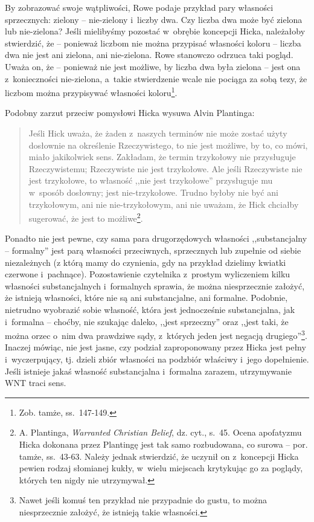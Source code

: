 By zobrazować swoje wątpliwości, Rowe podaje przykład pary własności sprzecznych: zielony -- nie-zielony i~liczby dwa. Czy liczba dwa może być zielona lub nie-zielona? Jeśli mielibyśmy pozostać w~obrębie koncepcji Hicka, należałoby stwierdzić, że -- ponieważ liczbom nie można przypisać własności koloru -- liczba dwa nie jest ani zielona, ani nie-zielona. Rowe stanowczo odrzuca taki pogląd. Uważa on, że -- ponieważ nie jest możliwe, by liczba dwa była zielona -- jest ona z~konieczności nie-zielona, a~takie stwierdzenie wcale nie pociąga za sobą tezy, że liczbom można przypisywać własności koloru\footnote{Zob. tamże, ss.~147-149.}.

Podobny zarzut przeciw pomysłowi Hicka wysuwa Alvin Plantinga:

\begin{quote}
Jeśli Hick uważa, że żaden z~naszych terminów nie może zostać użyty dosłownie na określenie Rzeczywistego, to nie jest możliwe, by to, co mówi, miało jakikolwiek sens. Zakładam, że termin trzykołowy nie przysługuje Rzeczywistemu; Rzeczywiste nie jest trzykołowe. Ale jeśli Rzeczywiste nie jest trzykołowe, to własność ,,nie jest trzykołowe'' przysługuje mu w~sposób dosłowny; jest nie-trzykołowe. Trudno byłoby nie być ani trzykołowym, ani nie nie-trzykołowym, ani nie uważam, że Hick chciałby sugerować, że jest to możliwe\footnote{A. Plantinga, \textit{Warranted Christian Belief}, dz. cyt., s.~45. Ocena apofatyzmu Hicka dokonana przez Plantingę jest tak samo rozbudowana, co surowa -- por. tamże, ss.~43-63. Należy jednak stwierdzić, że uczynił on z~koncepcji Hicka pewien rodzaj słomianej kukły, w~wielu miejscach krytykując go za poglądy, których ten nigdy nie utrzymywał.}.
\end{quote}

Ponadto nie jest pewne, czy sama para drugorzędowych własności ,,substancjalny -- formalny'' jest parą własności przeciwnych, sprzecznych lub zupełnie od siebie niezależnych (z którą mamy do czynienia, gdy na przykład dzielimy kwiatki czerwone i~pachnące). Pozostawienie czytelnika z~prostym wyliczeniem kilku własności substancjalnych i~formalnych sprawia, że można niesprzecznie założyć, że istnieją własności, które nie są ani substancjalne, ani formalne. Podobnie, nietrudno wyobrazić sobie własność, która jest jednocześnie substancjalna, jak i~formalna -- choćby, nie szukając daleko, ,,jest sprzeczny'' oraz ,,jest taki, że można orzec o~nim dwa prawdziwe sądy, z~których jeden jest negacją drugiego''\footnote{Nawet jeśli komuś ten przykład nie przypadnie do gustu, to można niesprzecznie założyć, że istnieją takie własności.}. Inaczej mówiąc, nie jest jasne, czy podział zaproponowany przez Hicka jest pełny i~wyczerpujący, tj. dzieli zbiór własności na podzbiór właściwy i~jego dopełnienie. Jeśli istnieje jakaś własność substancjalna i~formalna zarazem, utrzymywanie WNT traci sens.

